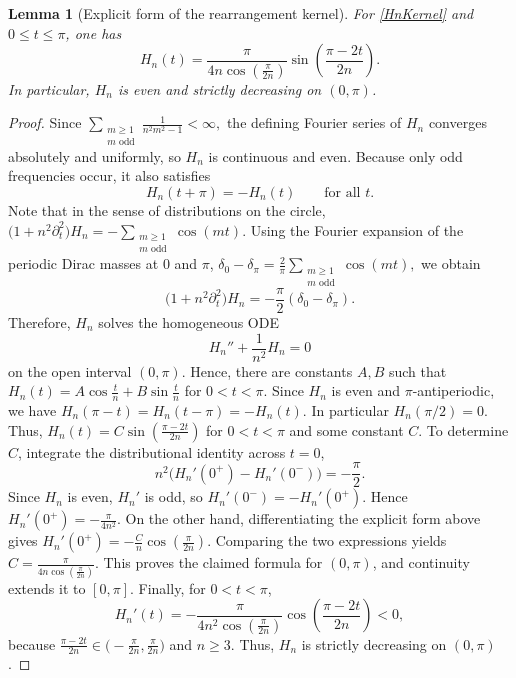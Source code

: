 \documentclass[11pt,letterpaper,reqno]{amsart}
\newtheorem{lemma}[theorem]{Lemma}
\begin{document}
\begin{lemma}[Explicit form of the rearrangement kernel]\label{lem:Hn-kernel}
For \eqref{HnKernel} and $0\le t\le \pi$, one has
\[
H_n(t)=\frac{\pi}{4n\cos\!\left(\frac{\pi}{2n}\right)}\sin\!\left(\frac{\pi-2t}{2n}\right).
\]
In particular, $H_n$ is even and strictly decreasing on $(0,\pi)$.
\end{lemma}

\begin{proof}
Since
$
\sum_{\substack{m\ge1\\m\text{ odd}}}\frac{1}{n^2m^2-1}<\infty,
$
the defining Fourier series of $H_n$ converges absolutely and uniformly, so $H_n$ is continuous and even. Because only odd frequencies occur, it also satisfies
\[
H_n(t+\pi)=-H_n(t)
\qquad\text{for all }t.
\]
Note that in the sense of distributions on the circle,
$
\bigl(1+n^2\partial_t^2\bigr)H_n
=-\sum_{\substack{m\ge1\\m\text{ odd}}}\cos(mt).
$
Using the Fourier expansion of the periodic Dirac masses at $0$ and $\pi$,
$
\delta_0-\delta_\pi=\frac{2}{\pi}\sum_{\substack{m\ge1\\m\text{ odd}}}\cos(mt),
$
we obtain
\[
\bigl(1+n^2\partial_t^2\bigr)H_n=-\frac{\pi}{2}(\delta_0-\delta_\pi).
\]
Therefore, $H_n$ solves the homogeneous ODE
\[
H_n''+\frac{1}{n^2}H_n=0
\]
on the open interval $(0,\pi)$. Hence, there are constants $A,B$ such that
$
H_n(t)=A\cos\frac{t}{n}+B\sin\frac{t}{n}
$
for $0<t<\pi$.
Since $H_n$ is even and $\pi$-antiperiodic, we have
$
H_n(\pi-t)=H_n(t-\pi)=-H_n(t).
$
In particular $H_n(\pi/2)=0$. Thus, 
\(
H_n(t)=C\sin\!\left(\frac{\pi-2t}{2n}\right)
\)
for $0<t<\pi$ and some constant $C$.
To determine $C$, integrate the distributional identity across $t=0$,
\[
n^2\bigl(H_n'(0^+)-H_n'(0^-)\bigr)=-\frac{\pi}{2}.
\]
Since $H_n$ is even, $H_n'$ is odd, so $H_n'(0^-)=-H_n'(0^+)$. Hence
\(
H_n'(0^+)=-\frac{\pi}{4n^2}.
\)
On the other hand, differentiating the explicit form above gives
\(
H_n'(0^+)=-\frac{C}{n}\cos\!\left(\frac{\pi}{2n}\right).
\)
Comparing the two expressions yields
\(
C=\frac{\pi}{4n\cos\!\left(\frac{\pi}{2n}\right)}.
\)
This proves the claimed formula for $(0,\pi)$, and continuity extends it to $[0,\pi]$. Finally, for $0<t<\pi$,
\[
H_n'(t)=-\frac{\pi}{4n^2\cos\!\left(\frac{\pi}{2n}\right)}\cos\!\left(\frac{\pi-2t}{2n}\right)<0,
\]
because $\frac{\pi-2t}{2n}\in\bigl(-\frac{\pi}{2n},\frac{\pi}{2n}\bigr)$ and $n\ge3$. Thus, $H_n$ is strictly decreasing on $(0,\pi)$.
\end{proof}
\end{document}
